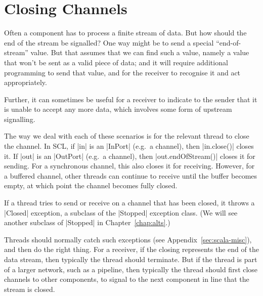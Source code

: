 \section{Closing Channels}

Often a component has to process a finite stream of data.  But how should the
end of the stream be signalled?  One way might be to send a special
``end-of-stream'' value.  But that assumes that we can find such a value,
namely a value that won't be sent as a valid piece of data; and it will
require additional programming to send that value, and for the receiver to
recognise it and act appropriately.

Further, it can sometimes be useful for a receiver to indicate to the sender
that it is unable to accept any more data, which involves some form of
upstream signalling.

The way we deal with each of these scenarios is for the relevant thread to
close the channel. 
%
In SCL, if |in| is an |InPort| (e.g.~a channel), then
|in.close()| closes it.
If |out| is an |OutPort| (e.g.~a channel), then
|out.endOfStream()| closes it for sending.  For a
synchronous channel, this also closes it for receiving.  However, for a
buffered channel, other threads can continue to receive until the buffer
becomes empty, at which point the channel becomes fully closed.


If a thread tries to send or receive on a channel that has been closed, it
throws a |Closed| exception, a subclass of the
|Stopped| exception class.  (We will see another
subclass of |Stopped| in Chapter~\ref{chap:alts}.)

Threads should normally catch such exceptions (see
Appendix~\ref{sec:scala-misc}), and then do the right thing.  For a receiver,
if the closing represents the end of the data stream, then typically the
thread should terminate.  But if the thread is part of a larger network, such
as a pipeline, then typically the thread should first close channels to other
components, to signal to the next component in line that the stream is closed.



